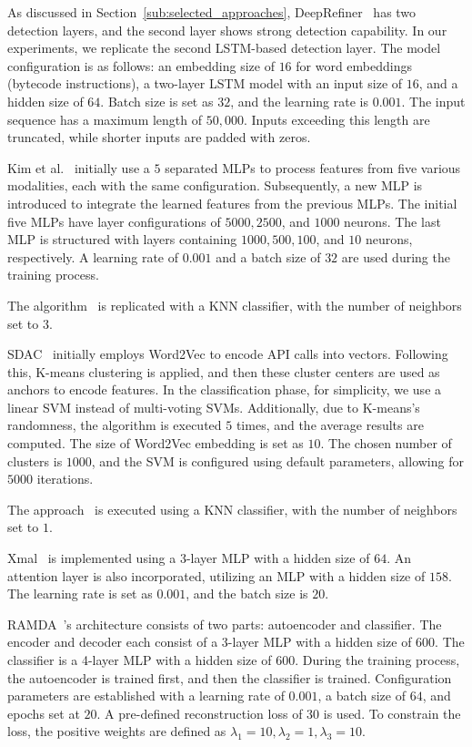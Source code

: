 As discussed in Section~\ref{sub:selected_approaches}, DeepRefiner~\cite{xu2018deeprefiner} has two detection layers, and the second layer shows strong detection capability.
In our experiments, we replicate the second LSTM-based detection layer.
The model configuration is as follows: an embedding size of $16$ for word embeddings (bytecode instructions), a two-layer LSTM model with an input size of $16$, and a hidden size of $64$.
Batch size is set as $32$, and the learning rate is $0.001$.
The input sequence has a maximum length of $50,000$.
Inputs exceeding this length are truncated, while shorter inputs are padded with zeros.

Kim et al.~\cite{kim2018multimodal} initially use a $5$ separated MLPs to process features from five various modalities, each with the same configuration.
Subsequently, a new MLP is introduced to integrate the learned features from the previous MLPs.
The initial five MLPs have layer configurations of $5000, 2500$, and $1000$ neurons.
The last MLP is structured with layers containing $1000, 500, 100$, and $10$ neurons, respectively.
A learning rate of $0.001$ and a batch size of $32$ are used during the training process.

The algorithm~\cite{wu2019malscan} is replicated with a KNN classifier, with the number of neighbors set to $3$.

SDAC~\cite{xu2020sdac} initially employs Word2Vec to encode API calls into vectors. Following this, K-means clustering is applied, and then these cluster centers are used as anchors to encode features.
In the classification phase, for simplicity, we use a linear SVM instead of multi-voting SVMs.
Additionally, due to K-means's randomness, the algorithm is executed $5$ times, and the average results are computed.
The size of Word2Vec embedding is set as $10$.
The chosen number of clusters is $1000$, and the SVM is configured using default parameters, allowing for $5000$ iterations.

The approach~\cite{wu2021homdroid} is executed using a KNN classifier, with the number of neighbors set to $1$.

Xmal~\cite{wu2021android} is implemented using a 3-layer MLP with a hidden size of $64$.
An attention layer is also incorporated, utilizing an MLP with a hidden size of $158$.
The learning rate is set as $0.001$, and the batch size is $20$.

RAMDA~\cite{li2021robust}'s architecture consists of two parts: autoencoder and classifier.
The encoder and decoder each consist of a 3-layer MLP with a hidden size of $600$.
The classifier is a 4-layer MLP with a hidden size of $600$.
During the training process, the autoencoder is trained first, and then the classifier is trained.
Configuration parameters are established with a learning rate of $0.001$, a batch size of $64$, and epochs set at $20$.
A pre-defined reconstruction loss of $30$ is used.
To constrain the loss, the positive weights are defined as $\lambda_1 = 10, \lambda_2 = 1, \lambda_3 = 10$.

